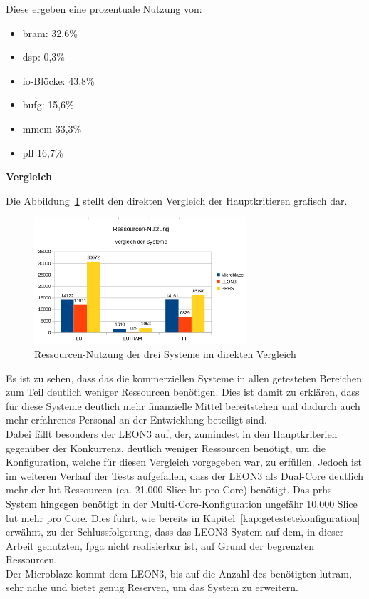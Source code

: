 Diese ergeben eine prozentuale Nutzung von:\\
\begin{itemize}
  \item \ac{bram}: 32,6\%
  \item \ac{dsp}:  0,3\%
  \item \ac{io}-Blöcke: 43,8\%
  \item \ac{bufg}: 15,6\%
  \item \ac{mmcm} 33,3\%
  \item \ac{pll} 16,7\%
\end{itemize}


\textbf{Vergleich}

Die Abbildung~\ref{fig:ressourcenresult} stellt den direkten Vergleich der Hauptkritieren grafisch dar.\\

\begin{figure}[H]
\centering
\includegraphics[width=0.7\textwidth]{Hauptteil/ressourcenresult.png}
\caption{Ressourcen-Nutzung der drei Systeme im direkten Vergleich}
\label{fig:ressourcenresult}
\end{figure}

Es ist zu sehen, dass das die kommerziellen Systeme in allen getesteten Bereichen zum Teil deutlich weniger Ressourcen benötigen.
Dies ist damit zu erklären, dass für diese Systeme deutlich mehr finanzielle Mittel bereitstehen und dadurch auch mehr
erfahrenes Personal an der Entwicklung beteiligt sind.\\
Dabei fällt besonders der LEON3 auf, der, zumindest in den Hauptkriterien gegenüber der Konkurrenz, deutlich weniger Ressourcen
benötigt, um die Konfiguration, welche für diesen Vergleich vorgegeben war, zu erfüllen. Jedoch ist im weiteren Verlauf der Tests aufgefallen, dass der LEON3 als Dual-Core deutlich mehr
 der \ac{lut}-Ressourcen (ca. 21.000 Slice \ac{lut} pro Core) benötigt. Das \ac{prhs}-System hingegen benötigt in der Multi-Core-Konfiguration ungefähr 10.000 Slice \ac{lut} mehr pro Core.
Dies führt, wie bereits in Kapitel~\ref{kap:getestetekonfiguration} erwähnt, zu der Schlussfolgerung, dass das LEON3-System auf dem, in dieser Arbeit genutzten, \ac{fpga} nicht realisierbar ist,
auf Grund der begrenzten Ressourcen.\\
 Der Microblaze kommt dem LEON3, bis auf die Anzahl des benötigten \ac{lutram}, sehr nahe und bietet genug Reserven, um das System zu erweitern.\\

